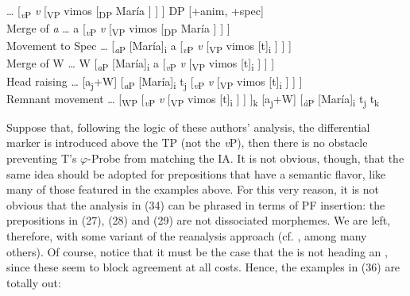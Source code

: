 \documentclass[output=paper]{langsci/langscibook}
\begin{document}
\ea
    \ea …  [\textit{\textsubscript{v}}\textsubscript{P}  \textit{v}  [\textsubscript{VP} vimos   [\textsubscript{DP} María ] ] ]    DP [+anim, +spec]\\
    Merge of \textit{a}
    \ex  …  a  [\textit{\textsubscript{v}}\textsubscript{P}  \textit{v}  [\textsubscript{VP} vimos   [\textsubscript{DP} María ] ] ]\\
    Movement to Spec 
    \ex  …  [\textit{\textsubscript{a}}\textsubscript{P} [María]\textsubscript{i}  a  [\textit{\textsubscript{v}}\textsubscript{P}  \textit{v}  [\textsubscript{VP} vimos [t]\textsubscript{i} ] ] ] \\
    Merge of W 
    \ex …  W [\textit{\textsubscript{a}}\textsubscript{P} [María]\textsubscript{i}  a  [\textit{\textsubscript{v}}\textsubscript{P}  \textit{v}  [\textsubscript{VP} vimos [t]\textsubscript{i} ] ] ]  \\
    Head raising 
    \ex …  [a\textsubscript{j}+W] [\textit{\textsubscript{a}}\textsubscript{P} [María]\textsubscript{i}  t\textsubscript{j}  [\textit{\textsubscript{v}}\textsubscript{P}  \textit{v}  [\textsubscript{VP} vimos [t]\textsubscript{i} ] ] ]  \\
    Remnant movement
    \ex …  [\textsubscript{WP}  [\textit{\textsubscript{v}}\textsubscript{P}  \textit{v}  [\textsubscript{VP} vimos [t]\textsubscript{i} ] ] ]\textsubscript{k} [a\textsubscript{j}+W] [\textit{\textsubscript{à}}\textsubscript{P} [María]\textsubscript{i}  t\textsubscript{j}  t\textsubscript{k}  
    \z
\z

Suppose that, following the logic of these authors’ analysis, the differential marker is introduced above the TP (not the \textit{v}P), then there is no obstacle preventing T’s $\varphi ${}-Probe from matching the IA. It is not obvious, though, that the same idea should be adopted for prepositions that have a semantic flavor, like many of those featured in the examples above. For this very reason, it is not obvious that the analysis in (34) can be phrased in terms of PF insertion: the prepositions in (27), (28) and (29) are not dissociated morphemes. We are left, therefore, with some variant of the reanalysis approach (cf. \citealt{Hornstein1981,Kayne1975,Kayne2004}, among many others). Of course, notice that it must be the case that the  is not heading an , since these seem to block agreement at all costs. Hence, the examples in (36) are totally out:



\ea%
    \label{ex:gallego:36}\\
    \z
\z    
\end{document}
